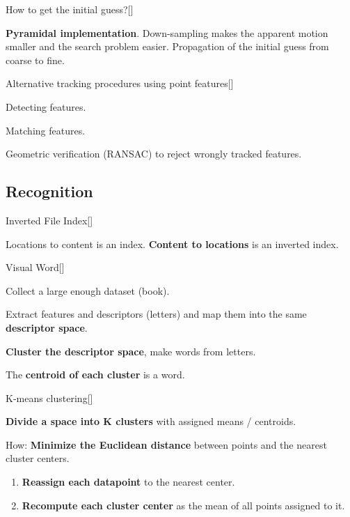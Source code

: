 \documentclass[10pt,a4paper]{scrartcl}
\begin{document}
\begin{multicols*}{2}
\begin{QandA}{How to get the initial guess?}[\Application]
\item \textbf{Pyramidal implementation}. Down-sampling makes the apparent motion smaller and the search problem easier. Propagation of the initial guess from coarse to fine.
\end{QandA}

\begin{QandA}
{Alternative tracking procedures using point features}[\Application]
\item Detecting features.
\item Matching features.
\item Geometric verification (RANSAC) to reject wrongly tracked features.
\end{QandA}

\subsection*{Recognition}

\begin{QandA}{Inverted File Index}[\Definition]
\item Locations to content is an index. \textbf{Content to locations} is an inverted index. 
\end{QandA}

\begin{QandA}{Visual Word}[\Definition]
\item Collect a large enough dataset (book).
\item Extract features and descriptors (letters) and map them into the same \textbf{descriptor space}.
\item \textbf{Cluster the descriptor space}, make words from letters.
\item The \textbf{centroid of each cluster} is a word.
\end{QandA}

\begin{QandA}{K-means clustering}[\Definition]
\item \textbf{Divide a space into K clusters} with assigned means / centroids.
\item How: \textbf{Minimize the Euclidean distance} between points and the nearest cluster centers.
\begin{enumerate}
\item \textbf{Reassign each datapoint} to the nearest center.
\item \textbf{Recompute each cluster center} as the mean of all points assigned to it.
\end{enumerate}
\end{QandA}


\end{multicols*}
\end{document}
